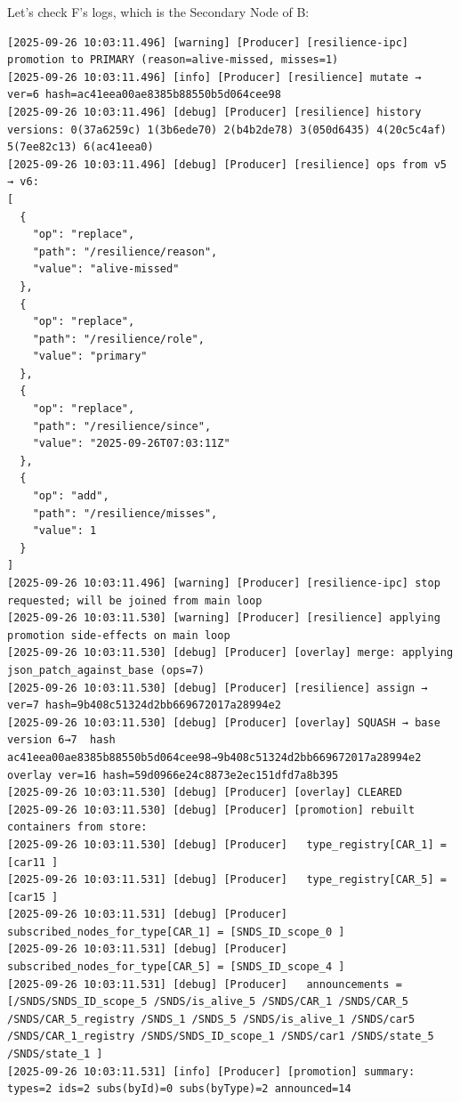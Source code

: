 \documentclass{article}
\begin{document}
Let's check F's logs, which is the Secondary Node of B:

\begin{lstlisting}[language=log, caption={Logs of Node F after providing the data of Node B}, label={lst:f-becoming-primary}]
[2025-09-26 10:03:11.496] [warning] [Producer] [resilience-ipc] promotion to PRIMARY (reason=alive-missed, misses=1)
[2025-09-26 10:03:11.496] [info] [Producer] [resilience] mutate → ver=6 hash=ac41eea00ae8385b88550b5d064cee98
[2025-09-26 10:03:11.496] [debug] [Producer] [resilience] history versions: 0(37a6259c) 1(3b6ede70) 2(b4b2de78) 3(050d6435) 4(20c5c4af) 5(7ee82c13) 6(ac41eea0) 
[2025-09-26 10:03:11.496] [debug] [Producer] [resilience] ops from v5 → v6:
[
  {
    "op": "replace",
    "path": "/resilience/reason",
    "value": "alive-missed"
  },
  {
    "op": "replace",
    "path": "/resilience/role",
    "value": "primary"
  },
  {
    "op": "replace",
    "path": "/resilience/since",
    "value": "2025-09-26T07:03:11Z"
  },
  {
    "op": "add",
    "path": "/resilience/misses",
    "value": 1
  }
]
[2025-09-26 10:03:11.496] [warning] [Producer] [resilience-ipc] stop requested; will be joined from main loop
[2025-09-26 10:03:11.530] [warning] [Producer] [resilience] applying promotion side-effects on main loop
[2025-09-26 10:03:11.530] [debug] [Producer] [overlay] merge: applying json_patch_against_base (ops=7)
[2025-09-26 10:03:11.530] [debug] [Producer] [resilience] assign → ver=7 hash=9b408c51324d2bb669672017a28994e2
[2025-09-26 10:03:11.530] [debug] [Producer] [overlay] SQUASH → base version 6→7  hash ac41eea00ae8385b88550b5d064cee98→9b408c51324d2bb669672017a28994e2  overlay ver=16 hash=59d0966e24c8873e2ec151dfd7a8b395
[2025-09-26 10:03:11.530] [debug] [Producer] [overlay] CLEARED
[2025-09-26 10:03:11.530] [debug] [Producer] [promotion] rebuilt containers from store:
[2025-09-26 10:03:11.530] [debug] [Producer]   type_registry[CAR_1] = [car11 ]
[2025-09-26 10:03:11.531] [debug] [Producer]   type_registry[CAR_5] = [car15 ]
[2025-09-26 10:03:11.531] [debug] [Producer]   subscribed_nodes_for_type[CAR_1] = [SNDS_ID_scope_0 ]
[2025-09-26 10:03:11.531] [debug] [Producer]   subscribed_nodes_for_type[CAR_5] = [SNDS_ID_scope_4 ]
[2025-09-26 10:03:11.531] [debug] [Producer]   announcements = [/SNDS/SNDS_ID_scope_5 /SNDS/is_alive_5 /SNDS/CAR_1 /SNDS/CAR_5 /SNDS/CAR_5_registry /SNDS_1 /SNDS_5 /SNDS/is_alive_1 /SNDS/car5 /SNDS/CAR_1_registry /SNDS/SNDS_ID_scope_1 /SNDS/car1 /SNDS/state_5 /SNDS/state_1 ]
[2025-09-26 10:03:11.531] [info] [Producer] [promotion] summary: types=2 ids=2 subs(byId)=0 subs(byType)=2 announced=14

\end{lstlisting}
\end{document}
